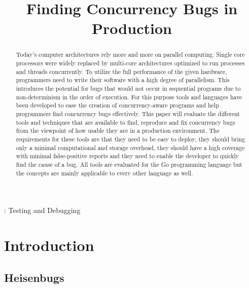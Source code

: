 \documentclass[conference]{IEEEtran}
\begin{document}
\title{Finding Concurrency Bugs in Production}

\author{
}

\maketitle

\begin{abstract}
Today's computer architectures rely more and more on parallel computing.
Single core processors were widely replaced by multi-core architectures optimized to run processes and threads concurrently.
To utilize the full performance of the given hardware, programmers need to write their software with a high degree of parallelism.
This introduces the potential for bugs that would not occur in sequential programs due to non-determinism in the order of execution.
For this purpose tools and languages have been developed to ease the creation of concurrency-aware programs and help programmers find concurrency bugs effectively.
This paper will evaluate the different tools and techniques that are available to find, reproduce and fix concurrency bugs from the viewpoint of how usable they are in a production environment.
The requirements for these tools are that they need to be easy to deploy, they should bring only a minimal computational and storage overhead, they should have a high coverage with minimal false-positive reports and they need to enable the developer to quickly find the cause of a bug.
All tools are evaluated for the Go programming language but the concepts are mainly applicable to every other language as well.
\end{abstract}

\begin{IEEEkeywords}
    : Testing and Debugging
\end{IEEEkeywords}


\section{Introduction}

\subsection{Heisenbugs}
\end{document}
